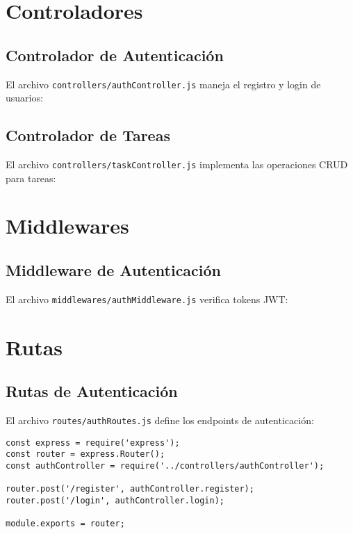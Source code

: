 \documentclass[12pt,a4paper]{article}
\begin{document}
\section{Controladores}

\subsection{Controlador de Autenticación}

El archivo \texttt{controllers/authController.js} maneja el registro y login de usuarios:



\subsection{Controlador de Tareas}

El archivo \texttt{controllers/taskController.js} implementa las operaciones CRUD para tareas:



\section{Middlewares}

\subsection{Middleware de Autenticación}

El archivo \texttt{middlewares/authMiddleware.js} verifica tokens JWT:



\section{Rutas}

\subsection{Rutas de Autenticación}

El archivo \texttt{routes/authRoutes.js} define los endpoints de autenticación:

\begin{lstlisting}
const express = require('express');
const router = express.Router();
const authController = require('../controllers/authController');

router.post('/register', authController.register);
router.post('/login', authController.login);

module.exports = router;
\end{lstlisting}
\end{document}
